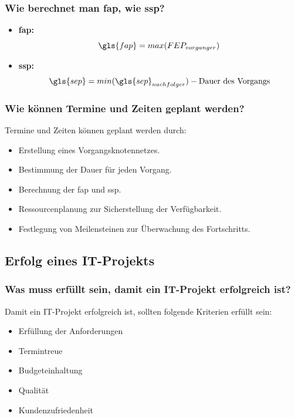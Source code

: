 \documentclass[main.tex]{subfiles}
\begin{document}
\subsubsection*{Wie berechnet man \gls{fap}, wie \gls{ssp}?}
\begin{itemize}
    \item \textbf{\gls{fap}:} 
    \begin{equation*}
      \gls{fap} = max (FEP_{vorganger})
    \end{equation*}
    \item \textbf{\gls{ssp}:} 
    \begin{equation*}
        \gls{sep} = min(\gls{sep}_{nachfolger}) - \text{Dauer des Vorgangs}
    \end{equation*}
\end{itemize}

\subsubsection*{Wie können Termine und Zeiten geplant werden?}
Termine und Zeiten können geplant werden durch:
\begin{itemize}
    \item Erstellung eines Vorgangsknotennetzes.
    \item Bestimmung der Dauer für jeden Vorgang.
    \item Berechnung der \gls{fap} und \gls{ssp}.
    \item Ressourcenplanung zur Sicherstellung der Verfügbarkeit.
    \item Festlegung von Meilensteinen zur Überwachung des Fortschritts.
\end{itemize}


\subsection{Erfolg eines IT-Projekts}
\subsubsection*{Was muss erfüllt sein, damit ein IT-Projekt erfolgreich ist?}
Damit ein IT-Projekt erfolgreich ist, sollten folgende Kriterien erfüllt sein:
\begin{itemize}
    \item Erfüllung der Anforderungen
    \item Termintreue
    \item Budgeteinhaltung
    \item Qualität
    \item Kundenzufriedenheit
\end{itemize}
\end{document}
